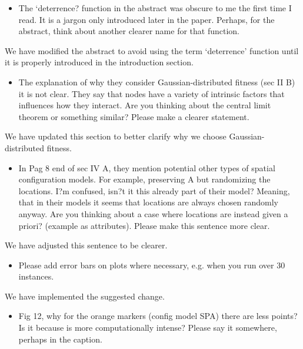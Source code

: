 \documentclass[12pt]{article}
\begin{document}
\begin{itemize}
\item The `deterrence? function in the abstract was obscure to me the first time I read. It
is a jargon only introduced later in the paper. Perhaps, for the abstract, think about
another clearer name for that function.
\end{itemize}

{\color{res} We have modified the abstract to avoid using the term `deterrence' function until it is properly introduced in the introduction section.}

\begin{itemize}
\item The explanation of why they consider Gaussian-distributed fitness (sec II B) it is not
clear. They say that nodes have a variety of intrinsic factors that influences how
they interact. Are you thinking about the central limit theorem or something similar?
Please make a clearer statement.
\end{itemize}

{\color{res} We have updated this section to better clarify why we choose Gaussian-distributed fitness.}

\begin{itemize}
\item In Pag 8 end of sec IV A, they mention potential other types of spatial configuration
models. For example, preserving A but randomizing the locations. I?m confused,
isn?t it this already part of their model? Meaning, that in their models it seems that
locations are always chosen randomly anyway. Are you thinking about a case where
locations are instead given a priori? (example as attributes). Please make this sentence
more clear.
\end{itemize}

{\color{res} We have adjusted this sentence to be clearer.}

\begin{itemize}
\item Please add error bars on plots where necessary, e.g. when you run over 30 instances.
\end{itemize}

{\color{res} We have implemented the suggested change.}

\begin{itemize}
\item Fig 12, why for the orange markers (config model SPA) there are less points? Is it
because is more computationally intense? Please say it somewhere, perhaps in the
caption.
\end{itemize}
\end{document}
